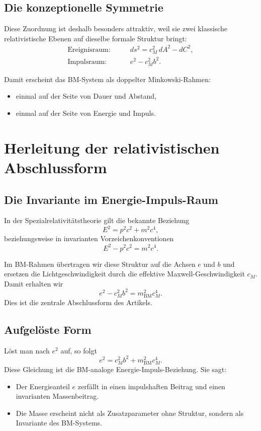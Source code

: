 \documentclass[11pt,a4paper]{article}
\theoremstyle{definition}
\theoremstyle{plain}
\begin{document}
	\subsection{Die konzeptionelle Symmetrie}
	
	Diese Zuordnung ist deshalb besonders attraktiv, weil sie zwei klassische relativistische Ebenen auf dieselbe formale Struktur bringt:
	\begin{align*}
		\text{Ereignisraum:} & \qquad ds^2 = c_M^2\, dA^2 - dC^2,\\
		\text{Impulsraum:} & \qquad e^2 - c_M^2 b^2.
	\end{align*}
	
	Damit erscheint das BM-System als doppelter Minkowski-Rahmen:
	\begin{itemize}[leftmargin=2em]
		\item einmal auf der Seite von Dauer und Abstand,
		\item einmal auf der Seite von Energie und Impuls.
	\end{itemize}
	
	\section{Herleitung der relativistischen Abschlussform}
	
	\subsection{Die Invariante im Energie-Impuls-Raum}
	
	In der Spezialrelativitätstheorie gilt die bekannte Beziehung
	\[
	E^2 = p^2 c^2 + m^2 c^4,
	\]
	beziehungsweise in invarianten Vorzeichenkonventionen
	\[
	E^2 - p^2 c^2 = m^2 c^4.
	\]
	
	Im BM-Rahmen übertragen wir diese Struktur auf die Achsen $e$ und $b$ und ersetzen die Lichtgeschwindigkeit durch die effektive Maxwell-Geschwindigkeit $c_M$. Damit erhalten wir
	\[
	e^2 - c_M^2 b^2 = m_{\mathrm{BM}}^2 c_M^4.
	\]
	Dies ist die zentrale Abschlussform des Artikels.
	
	\subsection{Aufgelöste Form}
	
	Löst man nach $e^2$ auf, so folgt
	\[
	e^2 = c_M^2 b^2 + m_{\mathrm{BM}}^2 c_M^4.
	\]
	Diese Gleichung ist die BM-analoge Energie-Impuls-Beziehung. Sie sagt:
	\begin{itemize}[leftmargin=2em]
		\item Der Energieanteil $e$ zerfällt in einen impulshaften Beitrag und einen invarianten Massenbeitrag.
		\item Die Masse erscheint nicht als Zusatzparameter ohne Struktur, sondern als Invariante des BM-Systems.
	\end{itemize}
	
\end{document}
